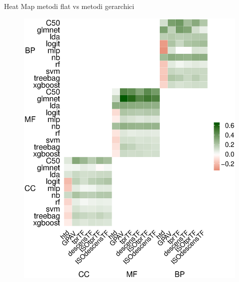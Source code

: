 \documentclass[9pt]{beamer}
\begin{document}
\begin{tframe}{Heat Map metodi flat vs metodi gerarchici}

\begin{figure}
\centering
\includegraphics[scale=0.22]{./img/HEATMAP1.eps}
\end{figure}
\end{tframe}
\end{document}
